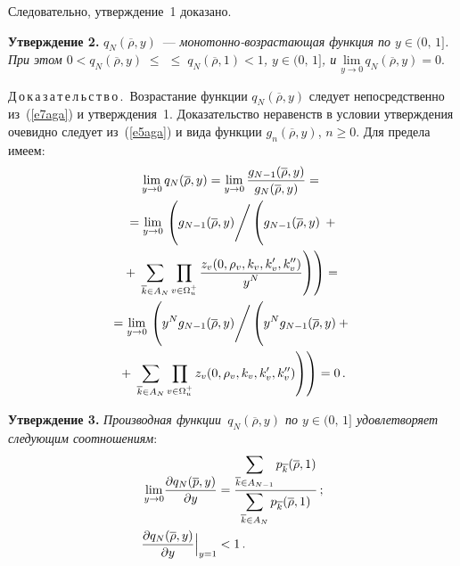 \begin{multicols}{2}
Следовательно, утверждение~1 доказано.

\medskip

\noindent
\textbf{Утверждение 2.} $q_N(\overline{\rho},y)$~--- \textit{монотонно-воз\-рас\-та\-ющая 
функция по $y\in (0,\,1]$. При этом $0< q_N(\overline{\rho},y)\;\leq $\linebreak 
$\leq\;q_N(\overline{\rho},1) <1$, $y\in (0,\,1]$,  и $\underset{y\rightarrow 
0}{\mathrm{lim}}\,q_N(\overline{\rho},y) =0$}.

\medskip

\noindent
Д\,о\,к\,а\,з\,а\,т\,е\,л\,ь\,с\,т\,в\,о\,.\  Возрастание функции 
$q_N(\overline{\rho},y)$ следует непосредственно из~(\ref{e7aga}) и 
утверж\-де\-ния~1. Доказательство неравенств в условии утверждения очевидно 
следует из~(\ref{e5aga}) и вида функции $g_n (\overline{\rho},y)$, $n\geq 0$. 
Для предела имеем:
\begin{multline*}
\underset{y\rightarrow 0}{\mathrm{lim}}\,q_N(\overline{\rho},y) 
=\underset{y\rightarrow 0}{\mathrm{lim}}\,\fr{g_{N- 1}(\overline{\rho},y)}{g_N(\overline{\rho},y)} = {}\\
{}= \underset{y\rightarrow 0}{\mathrm{lim}}\,\left (
g_{N-1}(\overline{\rho},y)\Bigg / \left ( 
\vphantom{\prod\limits_{v\in\Omega_u^+}}
g_{N-1}(\overline{\rho},y)\right.\right.+{}\\
{}+\left.\left.\sum\limits_{\overline{k}\in A_N}\prod\limits_{v\in\Omega_u^+} 
\fr{z_v(0,\rho_v,k_v,k^\prime_v,k^{\prime\prime}_v)}{y^N}\right )\right ) = {}\\
{}= \underset{y\rightarrow 0}{\mathrm{lim}}\,\left (
y^N g_{N-1}(\overline{\rho},y)\Bigg / 
\left ( 
\vphantom{\prod\limits_{v\in\Omega_u^+}}
y^N g_{N-1}(\overline{\rho},y)+{}\right.\right.\\
{}+\left.\left.\sum\limits_{\overline{k}\in A_N}
\prod\limits_{v\in\Omega_u^+} z_v(0,\rho_v,k_v,k_v^\prime , k_v^{\prime\prime}) 
\right ) \right )=0\,.
\end{multline*}
    
\medskip

\noindent
\textbf{Утверждение 3.} \textit{Производная функции~$q_N (\overline{\rho},y)$ по 
$y\in (0,\,1]$ удовлетворяет следующим соотношениям}:
\begin{align}
\underset{y\rightarrow 0}{\mathrm{lim}}\displaystyle\frac{\displaystyle \partial q_N(\overline{p},y)\mathstrut}{\displaystyle \partial  y\mathstrut} &= \displaystyle\frac{\displaystyle \sum\limits_{\overline{k}\in A_{N-1}} 
p_{\overline{k}}(\overline{\rho},1)\mathstrut}{\displaystyle \sum\limits_{\overline{k}\in 
A_N}p_{\overline{k}}(\overline{\rho},1)\mathstrut}\,;\label{e10aga}\\
\displaystyle\frac{\displaystyle \partial q_N(\overline{\rho},y)\mathstrut}{\displaystyle \partial y\mathstrut}\Big |_{y=1}&<1\,.\label{e11aga}
\end{align}


\end{multicols}
